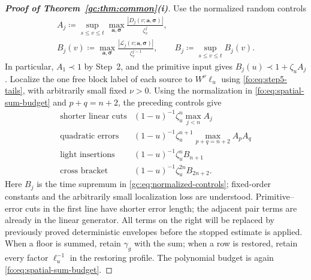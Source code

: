 \documentclass[11pt]{article}
\numberwithin{equation}{section}
\theoremstyle{remark}
\newcommand{\cL}{\mathcal L}
\begin{document}
\begin{proof}[\textbf{Proof of Theorem~\ref{gc:thm:common}(i)}]
Use the normalized random controls
\begin{equation}\label{gc:eq:normalized-controls}
 \begin{gathered}
 A_j\coloneqq\sup_{s\le v\le t}
     \max_{\boldsymbol a,\boldsymbol\sigma}
     \frac{|D_j(v;\boldsymbol a,\boldsymbol\sigma)|}{\zeta_v^j},\\
 B_j(v)\coloneqq\max_{\boldsymbol a,\boldsymbol\sigma}
     \frac{|\cL_j(v;\boldsymbol a,\boldsymbol\sigma)|}{\zeta_v^{j-1}},
 \qquad B_j\coloneqq\sup_{s\le v\le t}B_j(v).
 \end{gathered}
\end{equation}
In particular, $A_1\prec1$ by Step~2, and the primitive input gives
$B_j(u)\prec1+\zeta_u A_j$. Localize the one free block label of each
source to $W^\nu\ell_u$ using
\eqref{fo:eq:step5-tails}, with arbitrarily small fixed $\nu>0$.
Using the normalization in \eqref{fo:eq:spatial-sum-budget} and
$p+q=n+2$, the preceding controls give
\begin{equation}\label{gc:eq:sourcetable}
\begin{array}{c|c}
 \text{shorter linear cuts}&(1-u)^{-1}\zeta_u^n\max_{j<n}A_j\\
 \text{quadratic errors}&(1-u)^{-1}\zeta_u^{n+1}
                         \max_{p+q=n+2}A_pA_q\\
 \text{light insertions}&(1-u)^{-1}\zeta_u^n B_{n+1}\\
 \text{cross bracket}&(1-u)^{-1}\zeta_u^{2n}B_{2n+2}.
\end{array}
\end{equation}
Here $B_j$ is the time supremum in \eqref{gc:eq:normalized-controls};
fixed-order constants and the arbitrarily small localization loss are
understood. Primitive--error cuts in the first line have shorter error
length; the adjacent pair terms are already in the linear generator.
All terms on the right will be replaced by previously proved
deterministic envelopes before the stopped estimate is applied.
When a floor is summed, retain $\gamma_g$ with the sum; when a row is
restored, retain every factor $\ell_u^{-1}$ in the restoring profile.
The polynomial budget is again \eqref{fo:eq:spatial-sum-budget}.


\end{proof}
\end{document}
